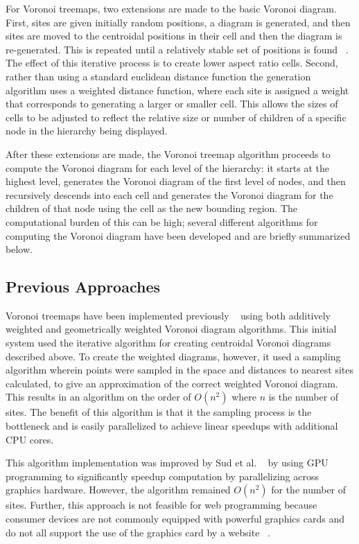 \documentclass{acm_proc_article-sp} \usepackage{cite}
\begin{document}
For Voronoi treemaps, two extensions are made to the basic Voronoi
diagram. First, sites are given initially random positions, a diagram
is generated, and then sites are moved to the centroidal positions in
their cell and then the diagram is re-generated. This is repeated
until a relatively stable set of positions is found ~\cite{lloyd}. The
effect of this iterative process is to create lower aspect ratio
cells. Second, rather than using a standard euclidean distance
function the generation algorithm uses a weighted distance function,
where each site is assigned a weight that corresponds to generating a
larger or smaller cell. This allows the sizes of cells to be adjusted
to reflect the relative size or number of children of a specific node
in the hierarchy being displayed.

After these extensions are made, the Voronoi treemap algorithm
proceeds to compute the Voronoi diagram for each level of the
hierarchy: it starts at the highest level, generates the Voronoi
diagram of the first level of nodes, and then recursively descends
into each cell and generates the Voronoi diagram for the children of
that node using the cell as the new bounding region. The computational
burden of this can be high; several different algorithms for computing
the Voronoi diagram have been developed and are briefly summarized
below.

\subsection{Previous Approaches}
Voronoi treemaps have been implemented previously
~\cite{balzer:treemaps} using both additively weighted and
geometrically weighted Voronoi diagram algorithms. This initial system
used the iterative algorithm for creating centroidal Voronoi
diagrams described above. To create the weighted diagrams, however, it
used a sampling algorithm wherein points were sampled in the space and
distances to nearest sites calculated, to give an approximation of the
correct weighted Voronoi diagram. This results in an algorithm on the
order of $O(n^2)$ where $n$ is the number of sites. The benefit of
this algorithm is that it the sampling process is the bottleneck and
is easily parallelized to achieve linear speedups with additional CPU
cores.

This algorithm implementation was improved by Sud et
al. ~\cite{sud:fast} by using GPU programming to significantly speedup
computation by parallelizing across graphics hardware. However, the
algorithm remained $O(n^2)$ for the number of sites. Further, this
approach is not feasible for web programming because consumer devices
are not commonly equipped with powerful graphics cards and do not all
support the use of the graphics card by a website ~\cite{needed}.
\end{document}
